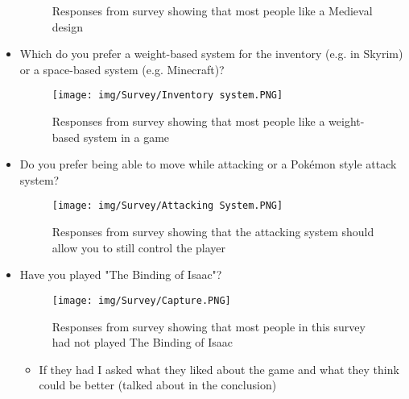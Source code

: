 \documentclass[../Main.tex]{subfiles}
\begin{document}
\begin{itemize}
\begin{figure}[hbt!]
                    \caption{Responses from survey showing that most people like a Medieval design}
                    \label{fig:Question3}
                \end{figure}
                \item Which do you prefer a weight-based system for the inventory (e.g. in Skyrim) or a space-based system (e.g. Minecraft)?
                \begin{figure}[hbt!]
                    \centerline{\texttt{[image: img/Survey/Inventory system.PNG]}}
                    \caption{Responses from survey showing that most people like a weight-based system in a game}
                    \label{fig:Question4}
                \end{figure}
                \clearpage
                \item Do you prefer being able to move while attacking or a Pokémon style attack system?
                \begin{figure}[hbt!]
                    \centerline{\texttt{[image: img/Survey/Attacking System.PNG]}}
                    \caption{Responses from survey showing that the attacking system should allow you to still control the player}
                    \label{fig:Question5}
                \end{figure}
                \item Have you played "The Binding of Isaac"?
                \begin{figure}[hbt!]
                    \centerline{\texttt{[image: img/Survey/Capture.PNG]}}
                    \caption{Responses from survey showing that most people in this survey had not played The Binding of Isaac}
                    \label{fig:Question6}
                \end{figure}
                \begin{itemize}
                    \item If they had I asked what they liked about the game and what they think could be better (talked about in the conclusion)
                \end{itemize}
            \end{itemize}
            \clearpage
\end{document}
